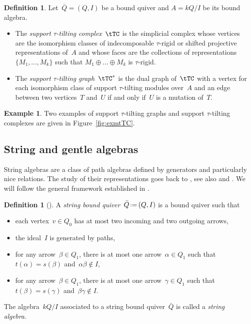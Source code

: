 \documentclass{amsart}
\theoremstyle{definition}
\newtheorem{definition}[theorem]{Definition}
\newtheorem{example}[theorem]{Example}
\newcommand{\eqdef}{\mbox{\,\raisebox{0.2ex}{\scriptsize\ensuremath{\mathrm:}}\ensuremath{=}\,}} %
\newcommand{\darkblue}{\color{darkblue}} %
\newcommand{\defn}[1]{\textsl{\darkblue #1}} %
\begin{document}
\begin{definition}\label{def: stautilt complex}
Let~$\bar Q = (Q,I)$ be a bound quiver and $A = kQ/I$ be its bound algebra.
\begin{itemize}
\item The \defn{support $\tau$-tilting complex}~$\tTC$ is the simplicial complex whose vertices are the isomorphism classes of indecomposable $\tau$-rigid or shifted projective representations of~$A$ and whose faces are the collections of representations~$\{M_1, \dots, M_k\}$ such that $M_1 \oplus \dots \oplus M_k$ is $\tau$-rigid.
\item The \defn{support $\tau$-tilting graph}~$\tTC^*$ is the dual graph of~$\tTC$ with a vertex for each isomorphism class of support $\tau$-tilting modules over~$A$ and an edge between two vertices~$T$ and~$U$ if and only if~$U$ is a mutation of~$T$.
\end{itemize}
\end{definition}

\begin{example}
 Two examples of support $\tau$-tilting graphs and support $\tau$-tilting complexes are given in Figure~\ref{fig:exmtTC}.
\end{example}

\subsection{String and gentle algebras}
\label{subsec:stringGentleAlgebra}

String algebras are a class of path algebras defined by generators and particularly nice relations.
The study of their representations goes back to \cite{GelfandPonomarev}, see also \cite{DonovanFreislich} and \cite{WaldWaschbusch}.
We will follow the general framework established in \cite{ButlerRingel}.

\begin{definition}[\cite{ButlerRingel}]
A \defn{string bound quiver}~$\bar Q \eqdef (Q,I)$ is a bound quiver such that
\begin{itemize}
\item each vertex~$v \in Q_0$ has at most two incoming and two outgoing arrows,
\item the ideal~$I$ is generated by paths,
\item for any arrow~$\beta \in Q_1$, there is at most one arrow~$\alpha \in Q_1$ such that~$t(\alpha) = s(\beta)$ and~$\alpha\beta\notin I$,
\item for any arrow~$\beta \in Q_1$, there is at most one arrow~$\gamma \in Q_1$ such that~$t(\beta) = s(\gamma)$ and~$\beta\gamma\notin I$.
\end{itemize}
The algebra~$kQ/I$ associated to a string bound quiver~$\bar Q$ is called a \defn{string algebra}.
\end{definition}
\end{document}
